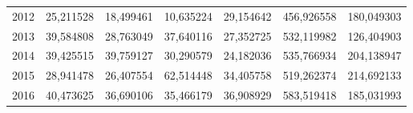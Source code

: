 \begin{table}
\begin{tabular}{p{1cm}p{2cm}p{2cm}p{2cm}p{2cm}p{2cm}p{2cm}}
 2012 &       25,211528 &        18,499461 &                             10,635224 & 29,154642 &                     456,926558 &        180,049303 \\
 2013 &       39,584808 &        28,763049 &                             37,640116 & 27,352725 &                     532,119982 &        126,404903 \\
 2014 &       39,425515 &        39,759127 &                             30,290579 & 24,182036 &                     535,766934 &        204,138947 \\
 2015 &       28,941478 &        26,407554 &                             62,514448 & 34,405758 &                     519,262374 &        214,692133 \\
 2016 &       40,473625 &        36,690106 &                             35,466179 & 36,908929 &                     583,519418 &        185,031993 \\
\bottomrule
\end{tabular}
\end{table}
